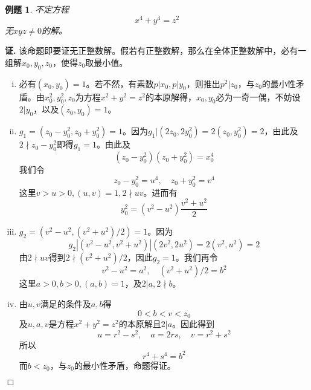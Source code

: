 \documentclass{ctexart}
\newtheorem{exmp}{例题}[section]
\renewenvironment{proof}[1][证]{\noindent \textbf{#1.} }{\hfill$\Box$}
\begin{document}
\begin{exmp}
不定方程
\begin{displaymath}
x^4+y^4=z^2
\end{displaymath}
无$xyz\neq 0$的解。
\end{exmp}
\begin{proof}
该命题即要证无正整数解。假若有正整数解，那么在全体正整数解中，必有一组解$x_0,y_0,z_0$，使得$z_0$取最小值。
\begin{enumerate}[(i)]
\item 必有$(x_0,y_0)=1$。若不然，有素数$p|x_0,p|y_0$，则推出$p^2|z_0$，与$z_0$的最小性矛盾。由$x_0^2,y_0^2,z_0$为方程$x^2+y^2=z^2$的本原解得，$x_0,y_0$必为一奇一偶，不妨设$2|y_0$，以及$(z_0,y_0)=1$。
\item $g_1=(z_0-y_0^2,z_0+y_0^2)=1$。因为$g_1|(2z_0,2y_0^2)=2(z_0,y_0^2)=2$，由此及$2\nmid z_0-y_0^2$即得$g_1=1$。由此及
\begin{displaymath}
(z_0-y_0^2)(z_0+y_0^2)=x_0^4
\end{displaymath}
我们令
\begin{displaymath}
z_0-y_0^2=u^4,\quad z_0+y_0^2=v^4
\end{displaymath}
这里$v>u>0,(u,v)=1,2\nmid uv$。进而有
\begin{equation}
y_0^2=(v^2-u^2)\frac{v^2+u^2}{2}
\end{equation}
\item $g_2=(v^2-u^2,(v^2+u^2)/2)=1$。因为
\begin{displaymath}
g_2|(v^2-u^2,v^2+u^2)|(2v^2,2u^2)=2(v^2,u^2)=2
\end{displaymath}
由$2\nmid uv$得到$2\nmid (v^2+u^2)/2$，因此$g_2=1$。我们再令
\begin{displaymath}
v^2-u^2=a^2,\quad (v^2+u^2)/2=b^2
\end{displaymath}
这里$a>0,b>0,(a,b)=1$，及$2|a,2\nmid b$。
\item 由$u,v$满足的条件及$a,b$得
\begin{displaymath}
0<b<v<z_0
\end{displaymath}
及$u,a,v$是方程$x^2+y^2=z^2$的本原解且$2|a$。因此得到
\begin{displaymath}
u=r^2-s^2,\quad a=2rs,\quad v=r^2+s^2
\end{displaymath}
所以
\begin{displaymath}
r^4+s^4=b^2
\end{displaymath}
而$b<z_0$，与$z_0$的最小性矛盾，命题得证。
\end{enumerate}
\end{proof}
\end{document}
